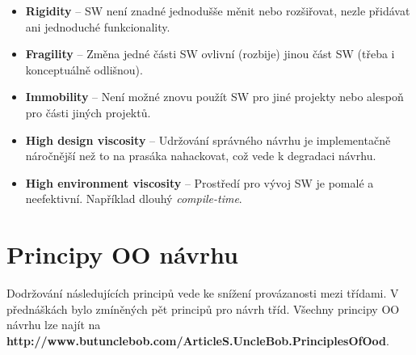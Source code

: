 \documentclass{szzclass}
\begin{document}
\begin{itemize}
      \item \textbf{Rigidity} -- SW není znadné jednodušše měnit nebo rozšiřovat,
      nezle přidávat ani jednoduché funkcionality.
      \item \textbf{Fragility} -- Změna jedné části SW ovlivní (rozbije) jinou 
      část SW (třeba i konceptuálně odlišnou).
      \item \textbf{Immobility} -- Není možné znovu použít SW pro jiné projekty
      nebo alespoň pro části jiných projektů.
      \item \textbf{High design viscosity} -- Udržování správného návrhu je implementačně náročnější
      než to na prasáka nahackovat, což vede k degradaci návrhu.
      \item \textbf{High environment viscosity} -- Prostředí pro vývoj SW je pomalé a neefektivní.
      Například dlouhý \textit{compile-time}.
\end{itemize}


\section{Principy OO návrhu}

Dodržování následujících principů vede ke snížení provázanosti mezi třídami.
V přednáškách bylo zmíněných pět principů pro návrh tříd.
Všechny principy OO návrhu lze najít na \textbf{http://www.butunclebob.com/ArticleS.UncleBob.PrinciplesOfOod}.
\end{document}
